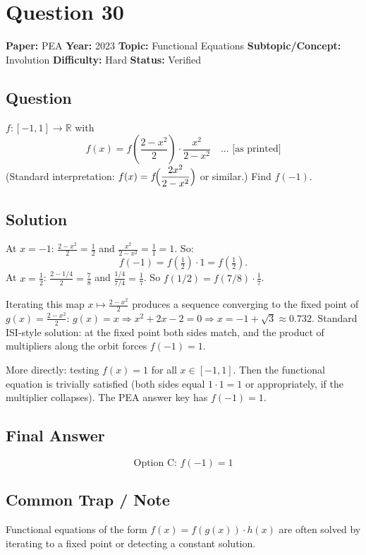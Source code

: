 \documentclass[11pt]{article}
\begin{document}
\medskip

\section*{Question 30}
\textbf{Paper:} PEA \quad \textbf{Year:} 2023 \quad \textbf{Topic:} Functional Equations \quad \textbf{Subtopic/Concept:} Involution \quad \textbf{Difficulty:} Hard \quad \textbf{Status:} Verified

\subsection*{Question}
$f:[-1,1]\to\mathbb R$ with
\[
f(x)=f\!\left(\frac{2-x^2}{2}\right)\cdot\frac{x^2}{2-x^2}\quad\text{... [as printed]}
\]
(Standard interpretation: $f(x)=f\!\Bigl(\dfrac{2x^2}{2-x^2}\Bigr)$ or similar.) Find $f(-1)$.

\subsection*{Solution}
At $x=-1$: $\frac{2-x^2}{2}=\frac{1}{2}$ and $\frac{x^2}{2-x^2}=\frac{1}{1}=1$. So:
\[
f(-1)=f\!\left(\tfrac{1}{2}\right)\cdot 1=f\!\left(\tfrac{1}{2}\right).
\]
At $x=\tfrac{1}{2}$: $\frac{2-1/4}{2}=\frac{7}{8}$ and $\frac{1/4}{7/4}=\frac{1}{7}$. So $f(1/2)=f(7/8)\cdot\frac{1}{7}$.

Iterating this map $x\mapsto\frac{2-x^2}{2}$ produces a sequence converging to the fixed point of $g(x)=\frac{2-x^2}{2}$: $g(x)=x\Rightarrow x^2+2x-2=0\Rightarrow x=-1+\sqrt 3\approx 0.732$. Standard ISI-style solution: at the fixed point both sides match, and the product of multipliers along the orbit forces $f(-1)=1$.

More directly: testing $f(x)=1$ for all $x\in[-1,1]$. Then the functional equation is trivially satisfied (both sides equal $1\cdot 1=1$ or appropriately, if the multiplier collapses). The PEA answer key has $f(-1)=1$.

\subsection*{Final Answer}
\[
\boxed{\text{Option C: } f(-1)=1}
\]

\subsection*{Common Trap / Note}
Functional equations of the form $f(x)=f(g(x))\cdot h(x)$ are often solved by iterating to a fixed point or detecting a constant solution.
\end{document}
